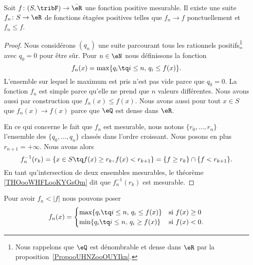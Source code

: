 \begin{lemma}    \label{LemYFoWqmS}
    Soit \( f\colon (S,\tribF)\to \bar\eR\) une fonction positive mesurable. Il existe une suite \( f_n\colon S\to \eR\) de fonctions étagées positives telles que \( f_n\to f\) ponctuellement et \( f_n \leq f\).
\end{lemma}

\begin{proof}
    Nous considérons \( (q_n)\) une suite parcourant tous les rationnels positifs\footnote{Nous rappelons que \( \eQ\) est dénombrable et dense dans \( \eR\) par la proposition~\ref{PropooUHNZooOUYIkn}.} avec \( q_0=0\) pour être sûr.
    Pour \( n\in \eN\) nous définissons la fonction
    \begin{equation}        \label{EqooXQYIooSSJwtM}
        f_n(x)= \max\{ q_i\tq i\leq n,\, q_i\leq f(x) \}.
    \end{equation}
    L'ensemble sur lequel le maximum est pris n'est pas vide parce que \( q_0=0\). La fonction \( f_n\) est simple parce qu'elle ne prend que \( n\) valeurs différentes. Nous avons aussi par construction que \(  f_n(x)\leq f(x) \). Nous avons aussi pour tout \( x\in S\) que \( f_n(x)\to f(x)\) parce que \( \eQ\) est dense dans \( \eR\).

    En ce qui concerne le fait que \( f_n\) est mesurable, nous notons \( \{ r_0,\ldots, r_{n} \}\) l'ensemble des \( \{ q_0,\ldots, q_n \}\) classés dans l'ordre croissant. Nous posons en plus \( r_{n+1}=+\infty\). Nous avons alors
    \begin{equation}
        f_n^{-1}(r_k)=\{ x\in S\tq f(x)\geq r_k,f(x)<r_{k+1} \}=\{ f\geq r_k \}\cap\{ f<r_{k+1} \}.
    \end{equation}
    En tant qu'intersection de deux ensembles mesurables, le théorème \ref{THOooWHFLooKYGsOm} dit que \( f_n^{-1}(r_k)\) est mesurable.
\end{proof}

\begin{remark}
    Pour avoir \(  f_n <| f |\) nous pouvons poser
    \begin{equation}
        f_n(x)=\begin{cases}
            \max\{ q_i\tq i\leq n,\, q_i\leq f(x) \}    &   \text{si } f(x)\geq 0\\
            \min\{ q_i\tq i\leq n,\, q_i\geq f(x) \}    &    \text{si } f(x)< 0\text{.}
        \end{cases}
    \end{equation}
\end{remark}

